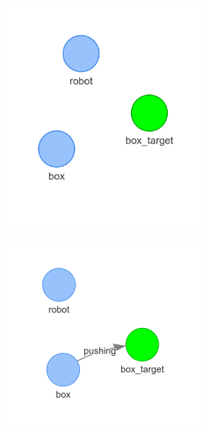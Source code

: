 \begin{figure}[h]
    \centering
    \begin{subfigure}{.3\textwidth}
    \centering
    \includegraphics[width=0.8\textwidth]{figures/proposed_method/connecting_nodes/robot_push/robot_push_1}
    \caption{}\label{subfig:robot_push_1}
    \end{subfigure}
    \begin{subfigure}{.3\textwidth}
    \centering
    \includegraphics[width=0.8\textwidth]{figures/proposed_method/connecting_nodes/robot_push/robot_push_2_new}

\end{subfigure}
\end{figure}
